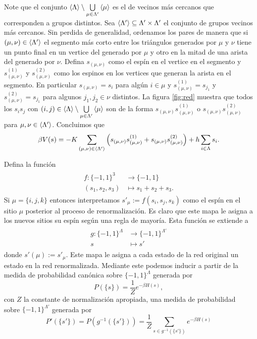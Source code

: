 \documentclass{article}
\begin{document}
\begin{enumerate}
Note que el conjunto $\ev{\Lambda}\setminus\bigcup\limits_{\mu\in\Lambda'}\ev{\mu}$ es el de vecinos más cercanos que corresponden a grupos distintos. Sea $\ev{\Lambda'}\subseteq\Lambda'\times\Lambda'$ el conjunto de grupos vecinos más cercanos. Sin perdida de generalidad, ordenamos los pares de manera que si $(\mu,\nu)\in\ev{\Lambda'}$ el segmento más corto entre los triángulos generados por $\mu$ y $\nu$ tiene un punto final en un vertice del generado por $\mu$ y otro en la mitad de una arista del generado por $\nu$. Defina $s_{(\mu,\nu)}$ como el espín en el vertice en el segmento y $s_{(\mu,\nu)}^{(1)}$ y $s_{(\mu,\nu)}^{(2)}$ como los espinos en los vertices que generan la arista en el segmento. En particular $s_{(\mu,\nu)}=s_i$ para algún $i\in\mu$ y $s_{(\mu,\nu)}^{(1)}=s_{j_1}$ y $s_{(\mu,\nu)}^{(2)}=s_{j_1}$ para algunos $j_1,j_2\in\nu$ distintos. La figura \ref{fig:red} muestra que todos los $s_is_j$ con $(i,j)\in\ev{\Lambda}\setminus\bigcup\limits_{\mu\in\Lambda'}\ev{\mu}$ son de la forma $s_{(\mu,\nu)}s_{(\mu,\nu)}^{(1)}$ o $s_{(\mu,\nu)}s_{(\mu,\nu)}^{(2)}$ para $\mu,\nu\in\ev{\Lambda'}$. Concluimos que 
\begin{equation}
\beta V(s)=-K\sum_{(\mu,\nu)\in\ev{\Lambda'}}\qty(s_{(\mu,\nu)}s_{(\mu,\nu)}^{(1)}+s_{(\mu,\nu)}s_{(\mu,\nu)}^{(2)})+h\sum_{i\in\Lambda}s_i.
\end{equation}

Defina la función 
\begin{align}
\begin{split}
f:\{-1,1\}^3&\rightarrow\{-1,1\}\\
(s_1,s_2,s_3)&\mapsto s_1+s_2+s_3.
\end{split}
\end{align}
Si $\mu=\{i,j,k\}$ entonces interpretamos $s'_\mu:=f(s_i,s_j,s_k)$ como el espín en el sitio $\mu$ posterior al proceso de renormalización. Es claro que este mapa le asigna a los nuevos sitios su espín según una regla de mayoría. Esta función se extiende a
\begin{align}
\begin{split}
g:\{-1,1\}^\Lambda&\rightarrow\{-1,1\}^{\Lambda'}\\
s&\mapsto s'
\end{split}
\end{align}
donde $s'(\mu):=s'_\mu$. Este mapa le asigna a cada estado de la red original un estado en la red renormalizada. Mediante este podemos inducir a partir de la medida de probabilidad canónica sobre $\{-1,1\}^\Lambda$ generada por
\begin{equation}
P(\{s\})=\frac{1}{Z}e^{-\beta H(s)},
\end{equation}
con $Z$ la constante de normalización apropiada, una medida de probabilidad sobre $\{-1,1\}^{\Lambda'}$ generada por
\begin{equation}
P'(\{s'\})=P(g^{-1}(\{s'\}))=\frac{1}{Z}\sum_{s\in g^{-1}(\{s'\})}e^{-\beta H(s)}
\end{equation}

\end{enumerate}



\end{document}

